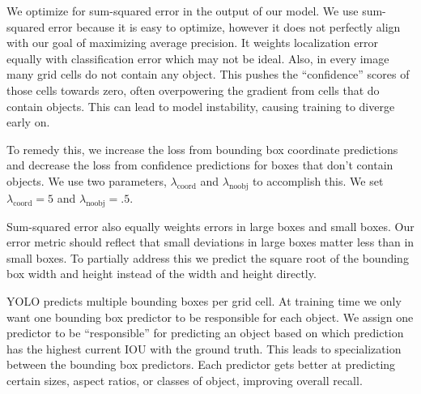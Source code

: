 \documentclass[10pt,twocolumn,letterpaper]{article}
\begin{document}
We optimize for sum-squared error in the output of our model. We use sum-squared error because it is easy to optimize, however it does not perfectly align with our goal of maximizing average precision. It weights localization error equally with classification error which may not be ideal. Also, in every image many grid cells do not contain any object. This pushes the ``confidence'' scores of those cells towards zero, often overpowering the gradient from cells that do contain objects. This can lead to model instability, causing training to diverge early on.

To remedy this, we increase the loss from bounding box coordinate predictions and decrease the loss from confidence predictions for boxes that don't contain objects. We use two parameters, $\lambda_\textrm{coord}$ and $\lambda_\textrm{noobj}$ to accomplish this. We set $\lambda_\textrm{coord} = 5$ and $\lambda_\textrm{noobj} = .5$.

Sum-squared error also equally weights errors in large boxes and small boxes. Our error metric should reflect that small deviations in large boxes matter less than in small boxes. To partially address this we predict the square root of the bounding box width and height instead of the width and height directly. 

YOLO predicts multiple bounding boxes per grid cell. At training time we only want one bounding box predictor to be responsible for each object. We assign one predictor to be ``responsible'' for predicting an object based on which prediction has the highest current IOU with the ground truth. This leads to specialization between the bounding box predictors. Each predictor gets better at predicting certain sizes, aspect ratios, or classes of object, improving overall recall.
\end{document}
